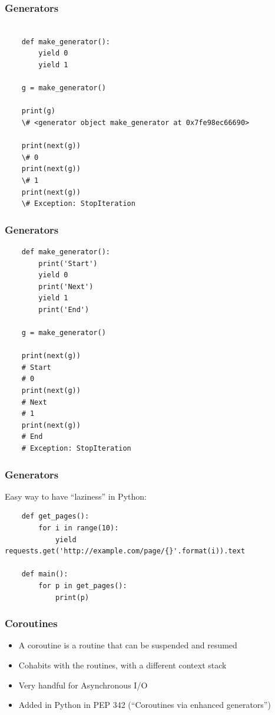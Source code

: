 \documentclass[ignorenonframetext,]{beamer}
\begin{document}
\begin{frame}[fragile]\frametitle{Generators}

\begin{verbatim}

    def make_generator():
        yield 0
        yield 1

    g = make_generator()

    print(g)
    \# <generator object make_generator at 0x7fe98ec66690>

    print(next(g))
    \# 0
    print(next(g))
    \# 1
    print(next(g))
    \# Exception: StopIteration

\end{verbatim}

\end{frame}

\begin{frame}[fragile]\frametitle{Generators}

\begin{verbatim}
    def make_generator():
        print('Start')
        yield 0
        print('Next')
        yield 1
        print('End')

    g = make_generator()

    print(next(g))
    # Start
    # 0
    print(next(g))
    # Next
    # 1
    print(next(g))
    # End
    # Exception: StopIteration
\end{verbatim}

\end{frame}

\begin{frame}[fragile]\frametitle{Generators}

Easy way to have ``laziness'' in Python:

\begin{verbatim}
    def get_pages():
        for i in range(10):
            yield requests.get('http://example.com/page/{}'.format(i)).text

    def main():
        for p in get_pages():
            print(p)
\end{verbatim}

\end{frame}

\begin{frame}[fragile]\frametitle{Coroutines}

\begin{itemize}
\itemsep1pt\parskip0pt
\item
  A coroutine is a routine that can be suspended and resumed
\item
  Cohabits with the routines, with a different context stack
\item
  Very handful for Asynchronous I/O
\item
  Added in Python in PEP 342 (``Coroutines via enhanced generators'')
\end{itemize}

\end{frame}
\end{document}
